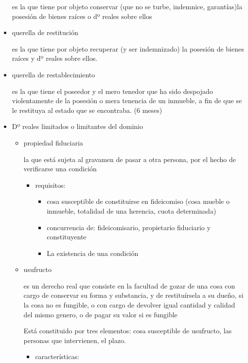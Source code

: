 \documentclass[]{article}
\providecommand{\tightlist}{%
  \setlength{\itemsep}{0pt}\setlength{\parskip}{0pt}}
\begin{document}
\begin{itemize}
  es la que tiene por objeto conservar (que no se turbe, indemnice,
  garantías)la posesión de bienes raíces o dº reales sobre ellos
\item
  querella de restitución

  es la que tiene por objeto recuperar (y ser indemnizado) la posesión
  de bienes raíces y dº reales sobre ellos.
\item
  querella de restablecimiento

  es la que tiene el poseedor y el mero tenedor que ha sido despojado
  violentamente de la posesión o mera tenencia de un inmueble, a fin de
  que se le restituya al estado que se encontraba. (6 meses)
\item
  Dº reales limitados o limitantes del dominio

  \begin{itemize}
  \item
    propiedad fiduciaria

    la que está sujeta al gravamen de pasar a otra persona, por el hecho
    de verificarse una condición

    \begin{itemize}
    \tightlist
    \item
      requisitos:

      \begin{itemize}
      \tightlist
      \item
        cosa susceptible de constituirse en fideicomiso (cosa mueble o
        inmueble, totalidad de una herencia, cuota determinada)
      \item
        concurrencia de: fideicomisario, propietario fiduciario y
        constituyente
      \item
        La existencia de una condición
      \end{itemize}
    \end{itemize}
  \item
    usufructo

    es un derecho real que consiste en la facultad de gozar de una cosa
    con cargo de conservar su forma y substancia, y de restituírsela a
    su dueño, si la cosa no es fungible, o con cargo de devolver igual
    cantidad y calidad del mismo genero, o de pagar su valor si es
    fungible

    Está constituido por tres elementos: cosa susceptible de usufructo,
    las personas que intervienen, el plazo.

    \begin{itemize}
    \tightlist
    \item
      características:


\end{itemize}
\end{itemize}
\end{itemize}
\end{document}
